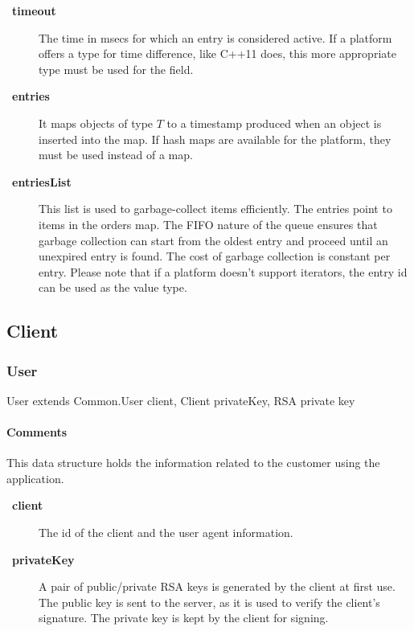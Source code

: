 \documentclass[a4paper,10pt,draft]{article}
\let\Item\item
\newcommand\SpecialItem{\renewcommand\item[1][]{\Item[\textbullet~\bfseries##1]}
}
\begin{document}
\SpecialItem
\begin{description}
 \item[timeout] The time in msecs for which an entry is considered active. If a platform offers a type for time difference, like C++11 does, this more appropriate type must be 
used for the field.
 \item[entries] It maps objects of type $T$ to a timestamp produced when an object is inserted into the map. If hash maps are available for the platform, they must be used instead 
of a map.
 \item[entriesList] This list is used to garbage-collect items efficiently. The entries point to items in the orders map. The FIFO nature of the queue ensures that garbage 
collection can start from the oldest entry and proceed until an unexpired entry is found. The cost of garbage collection is constant per entry. Please note that if a platform 
doesn't support iterators, the entry id can be used as the value type.
\end{description}

\subsection{Client}
\label{sec:structure:client}

\subsubsection{User}

\begin{verbbox}
User extends Common.User
{
  client, Client
  privateKey, RSA private key
}
\end{verbbox}
\begin{center}
\theverbbox
\end{center}

\begin{inparaitem}[ ]
 \item \unique
 \item \secure
 \item \persistent
\end{inparaitem}

\paragraph*{Comments}
This data structure holds the information related to the customer using the application.

\SpecialItem
\begin{description}
 \item[client] The id of the client and the user agent information.
 \item[privateKey] A pair of public/private RSA keys is generated by the client at first use. The public key is sent to the server, as it is used to verify the client's signature. 
The private key is kept by the client for signing.
\end{description}
\end{document}
